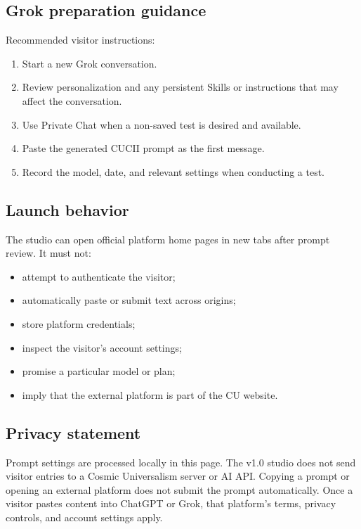 \documentclass[11pt,letterpaper]{article}
\begin{document}
\subsection{Grok preparation guidance}

Recommended visitor instructions:

\begin{enumerate}
    \item Start a new Grok conversation.
    \item Review personalization and any persistent Skills or instructions that may
          affect the conversation.
    \item Use Private Chat when a non-saved test is desired and available.
    \item Paste the generated CUCII prompt as the first message.
    \item Record the model, date, and relevant settings when conducting a test.
\end{enumerate}

\subsection{Launch behavior}

The studio can open official platform home pages in new tabs after prompt review.
It must not:

\begin{itemize}
    \item attempt to authenticate the visitor;
    \item automatically paste or submit text across origins;
    \item store platform credentials;
    \item inspect the visitor's account settings;
    \item promise a particular model or plan;
    \item imply that the external platform is part of the CU website.
\end{itemize}

\subsection{Privacy statement}

\begin{notebox}
Prompt settings are processed locally in this page. The v1.0 studio does not send
visitor entries to a Cosmic Universalism server or AI API. Copying a prompt or
opening an external platform does not submit the prompt automatically. Once a
visitor pastes content into ChatGPT or Grok, that platform's terms, privacy
controls, and account settings apply.
\end{notebox}
\end{document}
